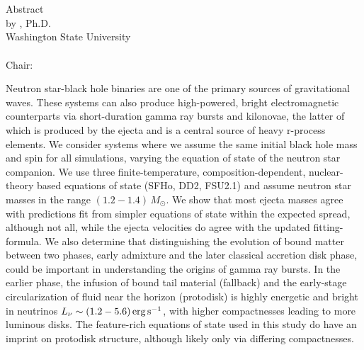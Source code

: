 \label{chap:chapter-1}

\begin{center}
	\begin{singlespace}
		\label{ssec:abstract}

		\MakeUppercase{\mytitleA}\\
    	\bigskip
    	\MakeUppercase{\mytitleB}\\
		\bigskip
		Abstract\\
		\bigskip \bigskip \bigskip
		by \myname, Ph.D.\\
		Washington State University\\
		\, \currentyear \\
		\bigskip \bigskip \bigskip
		Chair: \mychair	
	\end{singlespace}
\end{center}
  

Neutron star-black hole binaries are one of the primary sources of 
gravitational waves.  
These systems can also produce high-powered,
bright electromagnetic counterparts via short-duration gamma
ray bursts and kilonovae, the latter of which is produced by the ejecta and is a central source of heavy r-process elements.
We consider systems where we assume the same initial black hole mass
and spin for all simulations, varying the equation of state of the neutron
star companion.
We use three finite-temperature, composition-dependent, nuclear-theory based
equations of state (SFHo, DD2, FSU2.1) and assume neutron star masses
in the range $(1.2 - 1.4)\,M_\odot$.
We show that most ejecta masses agree with predictions fit from simpler 
equations of state within the expected spread, although not all, while the ejecta velocities do agree with the 
updated fitting-formula.
We also determine that distinguishing the evolution of bound matter between two phases, early admixture and the later classical accretion disk phase,
could be important in understanding the origins of 
gamma ray bursts.
In the earlier phase, the infusion of bound tail material (fallback) and the early-stage circularization of fluid near the horizon (protodisk) is highly energetic and bright in neutrinos \mbox{$L_{\nu} \sim (1.2 - 5.6)\,{\rm erg\,s}^{-1}$}, with higher compactnesses leading to more luminous disks.
The feature-rich equations of state used in this study do have an imprint on protodisk structure, although likely only via differing compactnesses.


\newpage